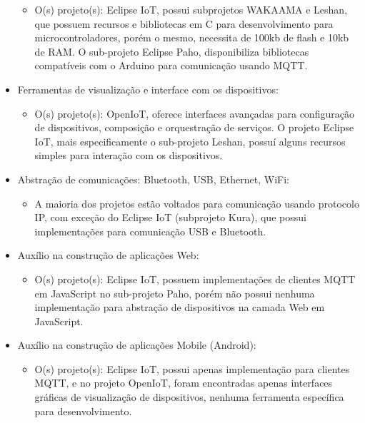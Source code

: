 \begin{itemize}
\begin{itemize}
\item O(s) projeto(s): Eclipse IoT, possui subprojetos WAKAAMA e Leshan,
que possuem recursos e bibliotecas em C para desenvolvimento para
microcontroladores, porém o mesmo, necessita de 100kb de flash e 10kb
de RAM. O sub-projeto Eclipse Paho, disponibiliza bibliotecas compatíveis
com o Arduino para comunicação usando MQTT.
\end{itemize}
\item Ferramentas de visualização e interface com os dispositivos:

\begin{itemize}
\item O(s) projeto(s): OpenIoT, oferece interfaces avançadas para configuração
de dispositivos, composição e orquestração de serviços. O projeto
Eclipse IoT, mais especificamente o sub-projeto Leshan, possuí alguns
recursos simples para interação com os dispositivos.
\end{itemize}
\item Abstração de comunicações: Bluetooth, USB, Ethernet, WiFi:

\begin{itemize}
\item A maioria dos projetos estão voltados para comunicação usando protocolo
IP, com exceção do Eclipse IoT (subprojeto Kura), que possui implementações
para comunicação USB e Bluetooth.
\end{itemize}
\item Auxílio na construção de aplicações Web:

\begin{itemize}
\item O(s) projeto(s): Eclipse IoT, possuem implementações de clientes MQTT
em JavaScript no sub-projeto Paho, porém não possui nenhuma implementação
para abstração de dispositivos na camada Web em JavaScript. 
\end{itemize}
\item Auxílio na construção de aplicações Mobile (Android):

\begin{itemize}
\item O(s) projeto(s): Eclipse IoT, possui apenas implementação para clientes
MQTT, e no projeto OpenIoT, foram encontradas apenas interfaces gráficas
de visualização de dispositivos, nenhuma ferramenta específica para
desenvolvimento.
\end{itemize}
\end{itemize}


